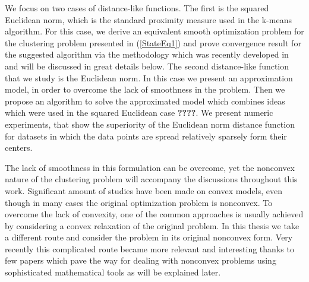\documentclass[12pt]{article}
\numberwithin{equation}{section}
\begin{document}

We focus on two cases of distance-like functions. The first is the squared Euclidean norm, which is the standard proximity measure used in the k-means algorithm. For this case, we derive an equivalent smooth optimization problem for the clustering problem presented in (\ref{StateEq1}) and prove convergence result for the suggested algorithm via the methodology which was recently developed in \cite{BST2014} and will be discussed in great details below. The second distance-like function that we study is the Euclidean norm. In this case we present an approximation model, in order to overcome the lack of smoothness in the problem. Then we propose an algorithm to solve the approximated model which combines ideas which were used in the squared Euclidean case \textbf{????}. We present numeric experiments, that show the superiority of the Euclidean norm distance function for datasets in which the data points are spread relatively sparsely form their centers.

The lack of smoothness in this formulation can be overcome, yet the nonconvex nature of the clustering problem will accompany the discussions throughout this work. Significant amount of studies have been made on convex models, even though in many cases the original optimization problem is nonconvex. To overcome the lack of convexity, one of the common approaches is usually achieved by considering a convex relaxation of the original problem. In this thesis we take a different route and consider the problem in its original nonconvex form. Very recently this complicated route became more relevant and interesting thanks to few papers which pave the way for dealing with nonconvex problems using sophisticated mathematical tools as will be explained later.
\end{document}
